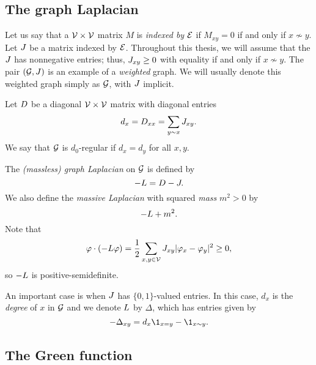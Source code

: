 
\subsection{The graph Laplacian}

Let us say that a $\mathcal{V}\times\mathcal{V}$ matrix $M$ is \emph{indexed by} $\mathcal{E}$
if $M_{xy} = 0$ if and only if $x \not\sim y$.
Let $J$ be a matrix indexed by $\mathcal{E}$.
Throughout this thesis, we will assume that the $J$ has nonnegative entries;
thus, $J_{xy} \ge 0$ with equality if and only if $x\not\sim y$.
The pair $(\mathcal{G}, J)$ is an example of a \emph{weighted} graph.
We will usually denote this weighted graph simply as $\mathcal{G}$, with $J$
implicit.

Let $D$ be a diagonal $\mathcal{V}\times\mathcal{V}$ matrix with diagonal entries
\begin{equation}
d_x = D_{xx} = \sum_{y \sim x} J_{xy}.
\end{equation}
We say that $\mathcal{G}$ is $d_0$-regular if $d_x = d_y$ for all $x, y$.

The \emph{(massless) graph Laplacian} on $\mathcal{G}$ is defined by
\begin{equation}
-L = D - J.
\end{equation}
We also define the \emph{massive Laplacian} with squared \emph{mass} $m^2 > 0$
by
\begin{equation}
-L + m^2.
\end{equation}
Note that
\begin{equation}
\varphi \cdot (-L \varphi)
  =
\frac{1}{2} \sum_{x,y\in\mathcal{V}} J_{xy} |\varphi_x - \varphi_y|^2
  \ge
0,
\end{equation}
so $-L$ is positive-semidefinite.

\begin{example}
An important case is when $J$ has $\{0, 1 \}$-valued entries.
In this case, $d_x$ is the \emph{degree} of $x$ in $\mathcal{G}$ and we denote $L$ by
$\Delta$, which has entries given by
\begin{equation}
\label{e:Deltaxy}
-\Delta_{xy} = d_x \1_{x=y} - \1_{x \sim y}.
\end{equation}
\end{example}


\subsection{The Green function}

